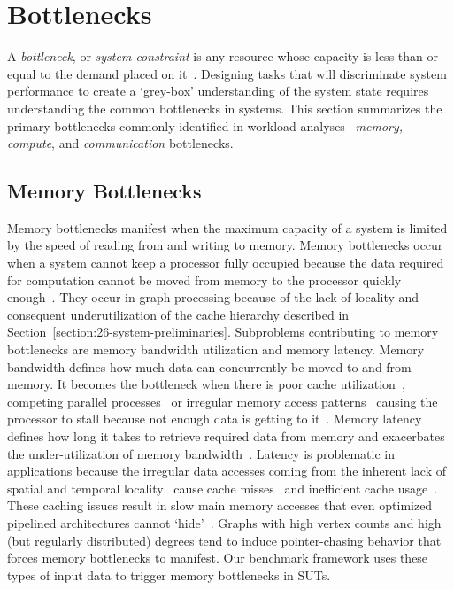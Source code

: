 \section{\gai Bottlenecks}
\label{section:33-literature-gai-bottlenecks}

A \textit{bottleneck}, or \textit{system constraint} is any resource whose capacity is less than or equal to the demand placed on it~\cite{Goldratt2004}. 
Designing tasks that will discriminate \gai system performance to create a `grey-box' understanding of the system state requires understanding the common bottlenecks in \gai systems.
This section summarizes the primary \gai bottlenecks commonly identified in \gai workload analyses-- \textit{memory, compute}, and \textit{communication} bottlenecks.

\subsection{Memory Bottlenecks}
Memory bottlenecks manifest when the maximum capacity of a system is limited by the speed of reading from and writing to memory.
Memory bottlenecks occur when a system cannot keep a processor fully occupied because the data required for computation cannot be moved from memory to the processor quickly enough~\cite{Hennessy2019}.
They occur in graph processing because of the lack of locality and consequent underutilization of the cache hierarchy described in Section~\ref{section:26-system-preliminaries}. 
Subproblems contributing to memory bottlenecks are memory bandwidth utilization and memory latency. 
Memory bandwidth defines how much data can concurrently be moved to and from memory.
It becomes the bottleneck when there is poor cache utilization~\cite{Ahn2015}, competing parallel processes~\cite{Fu2014, Buluc2012} or irregular memory access patterns~\cite{Aananthakrishnan2020, Zhang2017, Song2016} causing the processor to stall because not enough data is getting to it~\cite{Satish2014}.
Memory latency defines how long it takes to retrieve required data from memory and exacerbates the under-utilization of memory bandwidth~\cite{Kanev2015, Wu2021a}.
Latency is problematic in \gai applications because the irregular data accesses coming from the inherent lack of spatial and temporal locality~\cite{Oguntebi2016, Ham2016} cause cache misses~\cite{Song2016, Zhang2017, Beamer2015} and inefficient cache usage~\cite{Ham2016, Mukkara2018, Aananthakrishnan2020}.
These caching issues result in slow main memory accesses that even optimized pipelined architectures cannot `hide'~\cite{Dysart2016}.
Graphs with high vertex counts and high (but regularly distributed) degrees tend to induce pointer-chasing behavior that forces memory bottlenecks to manifest. Our \gai benchmark framework uses these types of input data to trigger memory bottlenecks in \ac{SUT}s.

